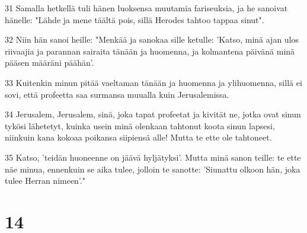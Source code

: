 \par 31 Samalla hetkellä tuli hänen luoksensa muutamia fariseuksia, ja he sanoivat hänelle: "Lähde ja mene täältä pois, sillä Herodes tahtoo tappaa sinut".
\par 32 Niin hän sanoi heille: "Menkää ja sanokaa sille ketulle: 'Katso, minä ajan ulos riivaajia ja parannan sairaita tänään ja huomenna, ja kolmantena päivänä minä pääsen määräni päähän'.
\par 33 Kuitenkin minun pitää vaeltaman tänään ja huomenna ja ylihuomenna, sillä ei sovi, että profeetta saa surmansa muualla kuin Jerusalemissa.
\par 34 Jerusalem, Jerusalem, sinä, joka tapat profeetat ja kivität ne, jotka ovat sinun tykösi lähetetyt, kuinka usein minä olenkaan tahtonut koota sinun lapsesi, niinkuin kana kokoaa poikansa siipiensä alle! Mutta te ette ole tahtoneet.
\par 35 Katso, 'teidän huoneenne on jäävä hyljätyksi'. Mutta minä sanon teille: te ette näe minua, ennenkuin se aika tulee, jolloin te sanotte: 'Siunattu olkoon hän, joka tulee Herran nimeen'."

\chapter{14}

